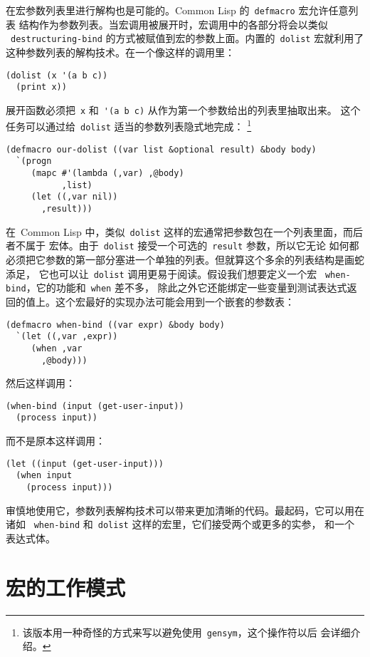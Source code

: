 在宏参数列表里进行解构也是可能的。Common Lisp 的~\texttt{defmacro} 宏允许任意列表
结构作为参数列表。当宏调用被展开时，宏调用中的各部分将会以类似
~\texttt{destructuring-bind} 的方式被赋值到宏的参数上面。内置的~\texttt{dolist}
宏就利用了这种参数列表的解构技术。在一个像这样的调用里：
\begin{lstlisting}
(dolist (x '(a b c))
  (print x))
\end{lstlisting}
展开函数必须把~\verb|x| 和~\verb|'(a b c)| 从作为第一个参数给出的列表里抽取出来。
这个任务可以通过给~\texttt{dolist} 适当的参数列表隐式地完成：
\footnote{该版本用一种奇怪的方式来写以避免使用~\texttt{gensym}，这个操作符以后
会详细介绍。}
\begin{lstlisting}
(defmacro our-dolist ((var list &optional result) &body body)
  `(progn
     (mapc #'(lambda (,var) ,@body)
           ,list)
     (let ((,var nil))
       ,result)))
\end{lstlisting}
在~Common Lisp 中，类似~\texttt{dolist} 这样的宏通常把参数包在一个列表里面，而后者不属于
宏体。由于~\texttt{dolist} 接受一个可选的~\texttt{result} 参数，所以它无论
如何都必须把它参数的第一部分塞进一个单独的列表。但就算这个多余的列表结构是画蛇添足，
它也可以让~\texttt{dolist} 调用更易于阅读。假设我们想要定义一个宏
~\texttt{when-bind}\label{mac:when_bind}，它的功能和~\texttt{when} 差不多，
除此之外它还能绑定一些变量到测试表达式返回的值上。这个宏最好的实现办法可能会用到一个嵌套的参数表：
\begin{lstlisting}
(defmacro when-bind ((var expr) &body body)
  `(let ((,var ,expr))
     (when ,var
       ,@body)))
\end{lstlisting}
然后这样调用：
\begin{lstlisting}
(when-bind (input (get-user-input))
  (process input))
\end{lstlisting}
而不是原本这样调用：
\begin{lstlisting}
(let ((input (get-user-input)))
  (when input
    (process input)))
\end{lstlisting}
审慎地使用它，参数列表解构技术可以带来更加清晰的代码。最起码，它可以用在诸如
~\texttt{when-bind} 和~\texttt{dolist} 这样的宏里，它们接受两个或更多的实参，
和一个表达式体。

\section{宏的工作模式}
\label{sec:a_model_of_macros}


